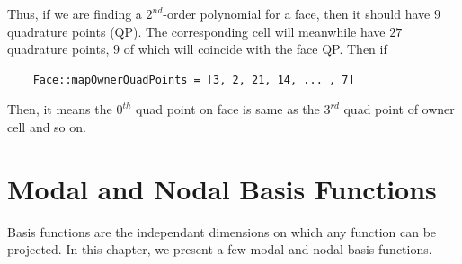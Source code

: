 Thus, if we are finding a $2^{nd}$-order polynomial for a face, then it should have $9$ quadrature points (QP).
The corresponding cell will meanwhile have $27$  quadrature points, $9$ of which will coincide with the face QP.
Then if 
\begin{verbatim}
	Face::mapOwnerQuadPoints = [3, 2, 21, 14, ... , 7]
\end{verbatim}
Then, it means the $0^{th}$ quad point on face is same as the $3^{rd}$ quad point of owner cell and so on. 


\section{Modal and Nodal Basis Functions}
Basis functions are the independant dimensions on which any function can be projected. In this chapter, we present a few 
modal and nodal basis functions.

